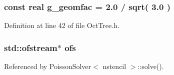 \subsubsection[{g\_\-geomfac}]{\setlength{\rightskip}{0pt plus 5cm}const {\bf real} {\bf g\_\-geomfac} = 2.0 / sqrt( 3.0 )}\label{OctTree_8h_a2289db72f053c67352cb6864b5a12fde}


Definition at line 42 of file OctTree.h.

\subsubsection[{ofs}]{\setlength{\rightskip}{0pt plus 5cm}std::ofstream$\ast$ {\bf ofs}}\label{OctTree_8h_afdd46b61e5c98d5faed15f63c63096e6}


Referenced by PoissonSolver$<$ nstencil $>$::solve().

